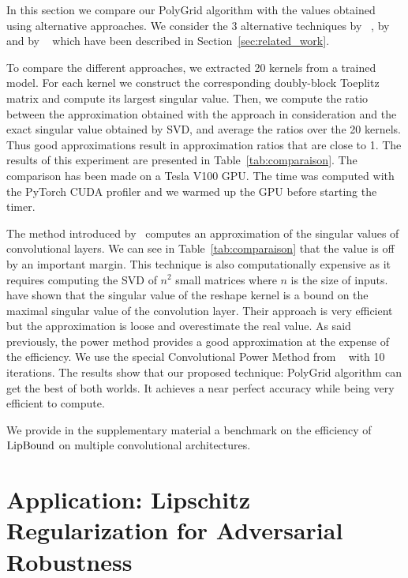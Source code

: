 In this section we compare our PolyGrid algorithm with the values obtained using alternative approaches.
We consider the 3 alternative techniques by ~\cite{sedghi2018the}, by~\cite{singla2019bounding} and by ~\cite{farnia2018generalizable} which have been described in Section~\ref{sec:related_work}. 

To compare the different approaches, we extracted 20 kernels from a trained model.
For each kernel we construct the corresponding doubly-block Toeplitz matrix and compute its largest singular value.
Then, we compute the ratio between the approximation obtained with the approach in consideration and the exact singular value obtained by SVD, and average the ratios over the 20 kernels.
Thus good approximations result in approximation ratios that are close to 1.
The results of this experiment are presented in Table~\ref{tab:comparaison}.
The comparison has been made on a Tesla V100 GPU. 
The time was computed with the PyTorch CUDA profiler and we warmed up the GPU before starting the timer.

The method introduced by~\cite{sedghi2018the} computes an  approximation of the singular values of convolutional layers.
We can see in Table~\ref{tab:comparaison} that the value is off by an important margin.
This technique is also computationally expensive as it requires computing the SVD of $n^2$ small matrices where $n$ is the size of inputs.
\cite{singla2019bounding} have shown that the singular value of the reshape kernel is a bound on the maximal singular value of the convolution layer.
Their approach is very efficient but the approximation is loose and overestimate the real value.
As said previously, the power method provides a good approximation at the expense of the efficiency.
We use the special Convolutional Power Method from ~\cite{farnia2018generalizable} with 10 iterations.
The results show that our proposed technique: PolyGrid algorithm can get the best of both worlds.
It achieves a near perfect accuracy while being very efficient to compute. 

We provide in the supplementary material a benchmark on the efficiency of $\operatorname{LipBound}$ on multiple convolutional architectures. 


\section{Application: Lipschitz Regularization for Adversarial Robustness}
\label{sec:experiments}

